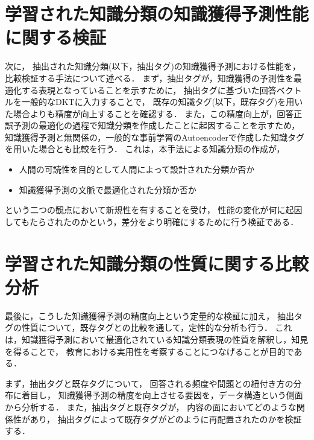 \section{学習された知識分類の知識獲得予測性能に関する検証}
次に，
抽出された知識分類(以下，抽出タグ)の知識獲得予測における性能を，比較検証する手法について述べる．
まず，抽出タグが，知識獲得の予測性を最適化する表現となっていることを示すために，
抽出タグに基づいた回答ベクトルを一般的なDKTに入力することで，
既存の知識タグ(以下，既存タグ)を用いた場合よりも精度が向上することを確認する．
また，この精度向上が，回答正誤予測の最適化の過程で知識分類を作成したことに起因することを示すため，
知識獲得予測と無関係の，一般的な事前学習のAutoencoderで作成した知識タグを用いた場合とも比較を行う．
これは，本手法による知識分類の作成が，
\begin{itemize}
	\item 人間の可読性を目的として人間によって設計された分類か否か
	\item 知識獲得予測の文脈で最適化された分類か否か
\end{itemize}
という二つの観点において新規性を有することを受け，
性能の変化が何に起因してもたらされたのかという，差分をより明確にするために行う検証である．




\section{学習された知識分類の性質に関する比較分析}
最後に，こうした知識獲得予測の精度向上という定量的な検証に加え，
抽出タグの性質について，既存タグとの比較を通して，定性的な分析も行う．
これは，知識獲得予測において最適化されている知識分類表現の性質を解釈し，知見を得ることで，
教育における実用性を考察することにつなげることが目的である．

まず，抽出タグと既存タグについて，
回答される頻度や問題との紐付き方の分布に着目し，
知識獲得予測の精度を向上させる要因を，データ構造という側面から分析する．
また，抽出タグと既存タグが，
内容の面においてどのような関係性があり，
抽出タグによって既存タグがどのように再配置されたのかを検証する．

